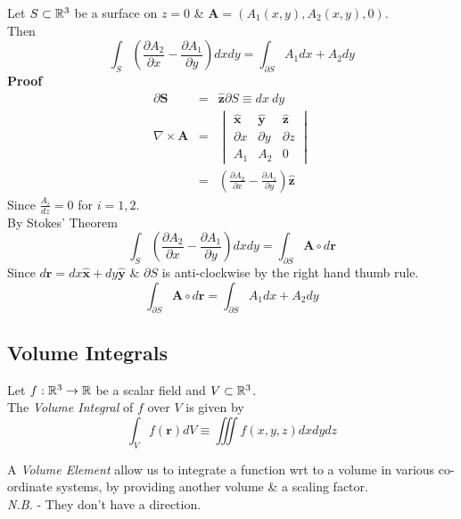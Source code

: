 \documentclass[11pt,a4paper]{article}
\begin{document}
Let $S\subset\mathbb{R}^3$ be a surface on $z=0$ \& $\textbf{A}=(A_1(x,y), A_2(x,y), 0)$.\\
Then
$$\int_S\left(\frac{\partial A_2}{\partial x}-\frac{\partial A_1}{\partial y}\right)dxdy=\int_{\partial S}A_1dx+A_2dy$$
\textbf{Proof}\\
\[\begin{array}{rcl}
\partial\textbf{S}&=&\hat{\textbf{z}}\partial S\equiv dx\ dy\\
\nabla\times\textbf{A}&=&\begin{vmatrix}
\hat{\textbf{x}}&\hat{\textbf{y}}&\hat{\textbf{z}}\\
\partial x&\partial y&\partial z\\
 A_1&A_2&0
\end{vmatrix}\\
&=&\left(\frac{\partial A_2}{\partial x}-\frac{\partial A_1}{\partial y}\right)\hat{\textbf{z}}
\end{array}\]
Since $\frac{A_i}{dz}=0$ for $i=1,2$.\\
By Stokes' Theorem
$$\int_S\left(\frac{\partial A_2}{\partial x}-\frac{\partial A_1}{\partial y}\right)dxdy=\int_{\partial S}\textbf{A}\circ d\textbf{r}$$
Since $d\textbf{r}=dx\hat{\textbf{x}}+dy\hat{\textbf{y}}$ \& $\partial S$ is anti-clockwise by the right hand thumb rule.
$$\int_{\partial S}\textbf{A}\circ d\textbf{r}=\int_{\partial S}A_1dx+A_2dy$$

\subsection{Volume Integrals}

Let $f:\mathbb{R}^3\to\mathbb{R}$ be a scalar field and $V\subset\mathbb{R}^3$.\\
The \textit{Volume Integral} of $f$ over $V$ is given by
$$\int_Vf(\textbf{r})dV\equiv\iiint f(x,y,z)dxdydz$$

A \textit{Volume Element} allow us to integrate a function wrt to a volume in various co-ordinate systems, by providing another volume \& a scaling factor.\\
\textit{N.B.} - They don't have a direction.\\
\end{document}
